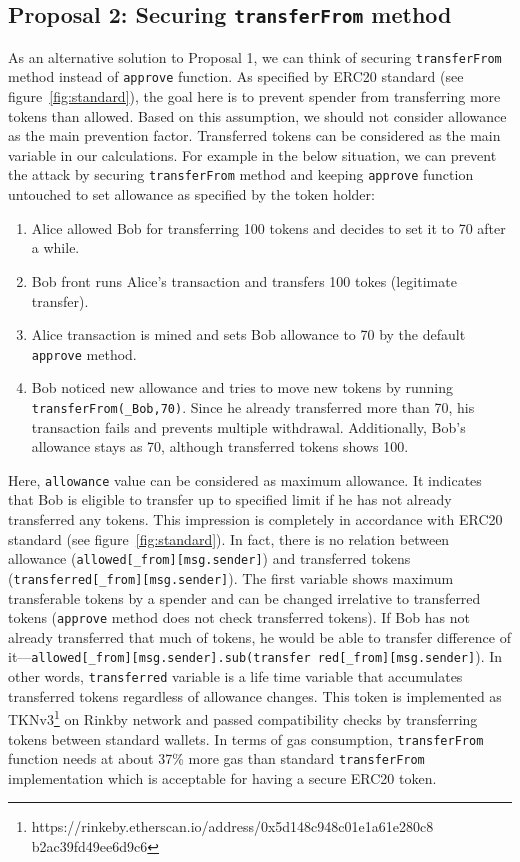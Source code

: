 \subsection{Proposal 2: Securing \texttt{transferFrom} method}\label{sec:proposal2}

As an alternative solution to Proposal 1, we can think of securing \texttt{transferFrom} method instead of \texttt{approve} function. As specified by ERC20 standard (see figure~\ref{fig:standard}), the goal here is to prevent spender from transferring more tokens than allowed. Based on this assumption, we should not consider allowance as the main prevention factor. Transferred tokens can be considered as the main variable in our calculations. For example in the below situation, we can prevent the attack by securing \texttt{transferFrom} method and keeping \texttt{approve} function untouched to set allowance as specified by the token holder:
\begin{enumerate}
	\item Alice allowed Bob for transferring 100 tokens and decides to set it to 70 after a while.
	\item Bob front runs Alice’s transaction and transfers 100 tokes (legitimate transfer).
	\item Alice transaction is mined and sets Bob allowance to 70 by the default \texttt{approve} method.
	\item Bob noticed new allowance and tries to move new tokens by running \texttt{transferFrom(\_Bob,70)}. Since he already transferred more than 70, his transaction fails and prevents multiple withdrawal. Additionally, Bob’s allowance stays as 70, although transferred tokens shows 100.
\end{enumerate}
Here, \texttt{allowance} value can be considered as maximum allowance. It indicates that Bob is eligible to transfer up to specified limit if he has not already transferred any tokens. This impression is completely in accordance with ERC20 standard (see figure~\ref{fig:standard}). In fact, there is no relation between allowance (\texttt{allowed[\_from][msg.sender]}) and transferred tokens (\texttt{transferred[\_from][msg.sender]}). The first variable shows maximum transferable tokens by a spender and can be changed irrelative to transferred tokens (\ie \texttt{approve} method does not check transferred tokens). If Bob has not already transferred that much of tokens, he would be able to transfer difference of it---\texttt{allowed[\_from][msg.sender].sub(transfer red[\_from][msg.sender]}). In other words, \texttt{transferred} variable is a life time variable that accumulates transferred tokens regardless of allowance changes. This token is implemented as TKNv3\footnote{https://rinkeby.etherscan.io/address/0x5d148c948c01e1a61e280c8 b2ac39fd49ee6d9c6} on Rinkby network and passed compatibility checks by transferring tokens between standard wallets. In terms of gas consumption, \texttt{transferFrom} function needs at about 37\% more gas than standard \texttt{transferFrom} implementation which is acceptable for having a secure ERC20 token.

